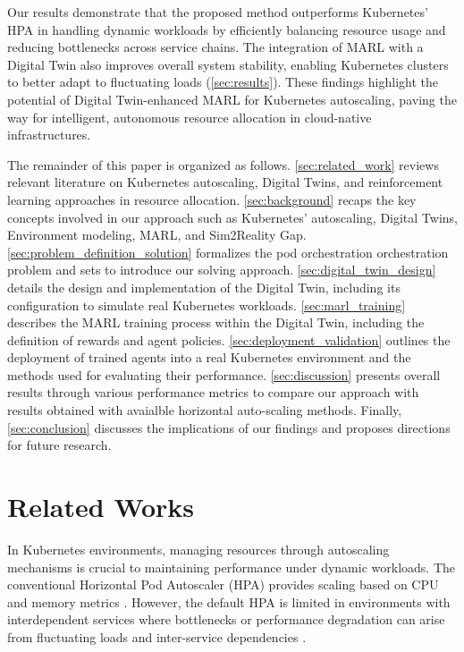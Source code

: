 \documentclass[conference]{IEEEtran}
\begin{document}
Our results demonstrate that the proposed method outperforms Kubernetes' HPA in handling dynamic workloads by efficiently balancing resource usage and reducing bottlenecks across service chains. The integration of MARL with a Digital Twin also improves overall system stability, enabling Kubernetes clusters to better adapt to fluctuating loads (\autoref{sec:results}). These findings highlight the potential of Digital Twin-enhanced MARL for Kubernetes autoscaling, paving the way for intelligent, autonomous resource allocation in cloud-native infrastructures.

The remainder of this paper is organized as follows.
\autoref{sec:related_work} reviews relevant literature on Kubernetes autoscaling, Digital Twins, and reinforcement learning approaches in resource allocation.
\autoref{sec:background} recaps the key concepts involved in our approach such as Kubernetes' autoscaling, Digital Twins, Environment modeling, MARL, and Sim2Reality Gap.
\autoref{sec:problem_definition_solution} formalizes the pod orchestration orchestration problem and sets to introduce our solving approach.
\autoref{sec:digital_twin_design} details the design and implementation of the Digital Twin, including its configuration to simulate real Kubernetes workloads.
\autoref{sec:marl_training} describes the MARL training process within the Digital Twin, including the definition of rewards and agent policies.
\autoref{sec:deployment_validation} outlines the deployment of trained agents into a real Kubernetes environment and the methods used for evaluating their performance.
\autoref{sec:discussion} presents overall results through various performance metrics to compare our approach with results obtained with avaialble horizontal auto-scaling methods.
Finally, \autoref{sec:conclusion} discusses the implications of our findings and proposes directions for future research.


\section{Related Works}
\label{sec:related_work}

In Kubernetes environments, managing resources through autoscaling mechanisms is crucial to maintaining performance under dynamic workloads. The conventional Horizontal Pod Autoscaler (HPA) provides scaling based on CPU and memory metrics \cite{hpa_design}. However, the default HPA is limited in environments with interdependent services where bottlenecks or performance degradation can arise from fluctuating loads and inter-service dependencies \cite{rosenberg_k8s_autoscaling}. 
\end{document}
